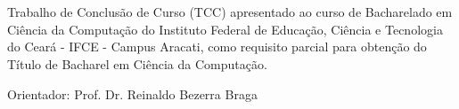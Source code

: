 \vfill
\begin{center}

{\imprimirautor\\}
\vspace{3cm}
{\textsc \imprimirtitulo\\}
\vspace{5cm}
\hspace{.45\linewidth}
\begin{minipage}{.50\linewidth}
Trabalho de Conclusão de Curso (TCC) apresentado ao curso de Bacharelado em Ciência da Computação do Instituto Federal de Educação, Ciência e Tecnologia do Ceará - IFCE - Campus Aracati, como requisito parcial para obtenção do Título de Bacharel em Ciência da Computação.

\vspace{0.5 cm}

Orientador: Prof. Dr. Reinaldo Bezerra Braga

\end{minipage}

\vspace{2cm}
\vfill
{\large \imprimirlocal\\\imprimirdata}

\end{center}
